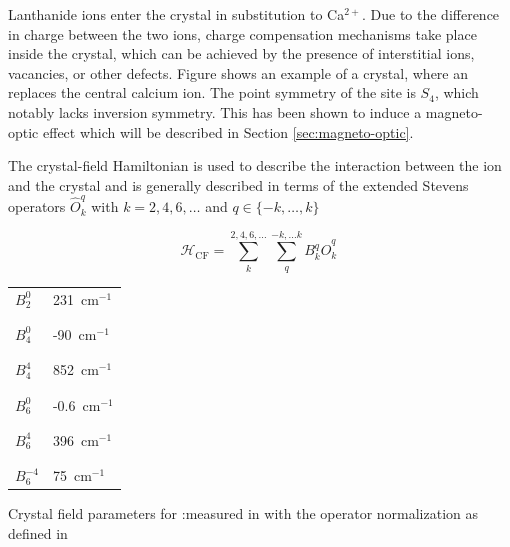 Lanthanide ions enter the crystal in substitution to Ca$^{2+}$. Due to the difference in charge between the two ions, charge compensation mechanisms take place inside the crystal, which can be achieved by the presence of interstitial ions, vacancies, or other defects. Figure  shows an example of a \Ca crystal, where an \Er replaces the central calcium ion. The point symmetry of the \Er site is $S_4$, which notably lacks inversion symmetry. This has been shown to induce a magneto-optic effect which will be described in Section \ref{sec:magneto-optic}.

The crystal-field Hamiltonian is used to describe the interaction between the ion and the crystal and is generally described in terms of the extended Stevens operators $\hat{O}^q_k$ with $k=2,4,6,\dots$ and $q \in \{-k,\dots, k\}$ 

\begin{equation}
    \mathcal{H}_{\mathrm{CF}} = \sum_{k}^{2,4,6,\dots}\sum_{q}^{-k,...k} B_k^q \hat{O}^q_k \,
\end{equation}

\begin{margintable}
\centering
\begin{tabular}{l|l}
$B_2^0$    & 231~cm$^{-1}$  \\[-1em] \\ \hline \\[-1em]
$B_4^0$    & -90~cm$^{-1}$  \\[-1em] \\ \hline \\[-1em]
$B_4^4$    & 852~cm$^{-1}$  \\[-1em] \\ \hline \\[-1em]
$B_6^0$    & -0.6~cm$^{-1}$ \\[-1em] \\ \hline \\[-1em]
$B_6^4$    & 396~cm$^{-1}$  \\[-1em] \\ \hline \\[-1em]
$B_6^{-4}$ & 75~cm$^{-1}$  
\end{tabular}
\caption[Crystal field parameters]{Crystal field parameters for \Er:\Ca measured in \cite{enrique_optical_1971} with the operator normalization as defined in \cite{erath_crystal_1961}}
\label{tab:cf_parameters}
\end{margintable}

